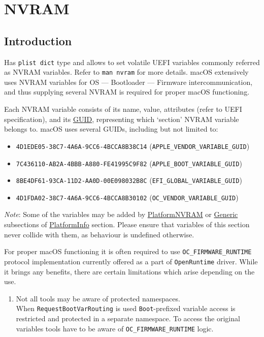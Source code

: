 \documentclass[]{article}
\providecommand{\tightlist}{%
  \setlength{\itemsep}{0pt}\setlength{\parskip}{0pt}}
\begin{document}
\section{NVRAM}\label{nvram}

\subsection{Introduction}\label{nvramintro}

Has \texttt{plist\ dict} type and allows to set volatile UEFI variables
commonly referred as NVRAM variables. Refer to \texttt{man\ nvram} for
more details. macOS extensively uses NVRAM variables for OS --- Bootloader
--- Firmware intercommunication, and thus supplying several NVRAM is
required for proper macOS functioning.

Each NVRAM variable consists of its name, value, attributes (refer to
UEFI specification), and its
\href{https://en.wikipedia.org/wiki/Universally_unique_identifier}{GUID},
representing which `section' NVRAM variable belongs to. macOS uses
several GUIDs, including but not limited to:

\begin{itemize}
\tightlist
\item
  \texttt{4D1EDE05-38C7-4A6A-9CC6-4BCCA8B38C14}
  (\texttt{APPLE\_VENDOR\_VARIABLE\_GUID})
\item
  \texttt{7C436110-AB2A-4BBB-A880-FE41995C9F82}
  (\texttt{APPLE\_BOOT\_VARIABLE\_GUID})
\item
  \texttt{8BE4DF61-93CA-11D2-AA0D-00E098032B8C}
  (\texttt{EFI\_GLOBAL\_VARIABLE\_GUID})
\item
  \texttt{4D1FDA02-38C7-4A6A-9CC6-4BCCA8B30102}
  (\texttt{OC\_VENDOR\_VARIABLE\_GUID})
\end{itemize}

\emph{Note}: Some of the variables may be added by
\hyperref[platforminfonvram]{PlatformNVRAM} or
\hyperref[platforminfogeneric]{Generic} subsections of
\hyperref[platforminfo]{PlatformInfo} section.
Please ensure that variables of this section never collide with them,
as behaviour is undefined otherwise.

For proper macOS functioning it is often required to use \texttt{OC\_FIRMWARE\_RUNTIME}
protocol implementation currently offered as a part of \texttt{OpenRuntime} driver.
While it brings any benefits, there are certain limitations which arise depending on the
use.

\begin{enumerate}
\item Not all tools may be aware of protected namespaces.\\
  When \texttt{RequestBootVarRouting} is used \texttt{Boot}-prefixed variable access
  is restricted and protected in a separate namespace. To access the original variables
  tools have to be aware of \texttt{OC\_FIRMWARE\_RUNTIME} logic.
\end{enumerate}
\end{document}
